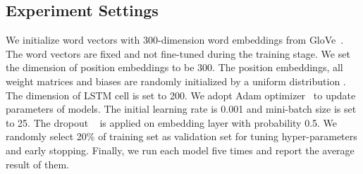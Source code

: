 \documentclass[letterpaper]{article} \usepackage{aaai20}  \usepackage{times}  \usepackage{helvet} \usepackage{courier}  \usepackage[hyphens]{url}  \usepackage{graphicx} \urlstyle{rm} \def\UrlFont{\rm}  \usepackage{graphicx}
\begin{document}
\subsection{Experiment Settings}
We initialize word vectors with 300-dimension word embeddings from GloVe~\cite{DBLP:conf/emnlp/PenningtonSM14}. The word vectors are fixed and not fine-tuned during the training stage. We set the dimension of position embeddings to be 300. The position embeddings, all weight matrices and biases are randomly initialized by a uniform distribution . The dimension of LSTM cell is set to 200. We adopt Adam optimizer~\cite{DBLP:journals/corr/KingmaB14} to update parameters of models. The initial learning rate is 0.001 and mini-batch size is set to 25. The dropout ~\cite{DBLP:journals/corr/abs-1207-0580} is applied on embedding layer with probability 0.5. We randomly select 20\% of training set as validation set for tuning hyper-parameters and early stopping. Finally, we run each model five times and report the average result of them.
\end{document}
